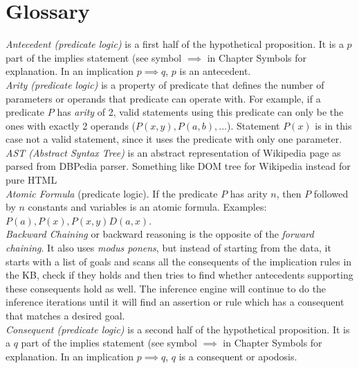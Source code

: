 % 
\chapter{Glossary}
\emph{Antecedent (predicate logic)} is a first half of the hypothetical 
proposition. It is a $p$ part of the implies statement (see symbol $\implies$ in
Chapter Symbols for explanation. In an implication $p \implies q$, $p$ is an
antecedent.\\

\emph{Arity (predicate logic)} is a property of predicate that defines the 
number of parameters or operands that predicate can operate with. For example,
if a predicate $P$ has \emph{arity} of 2, valid statements using this predicate
can only be the ones with exactly 2 operands ($P(x,y), P(a,b),...$). Statement
$P(x)$ is in this case not a valid statement, since it uses the predicate with
only one parameter.\\

\emph{AST (Abstract Syntax Tree)} is an abstract representation of Wikipedia 
page as parsed from DBPedia parser. Something like DOM tree for Wikipedia 
instead for pure HTML\\

\emph{Atomic Formula} (predicate logic). If the predicate $P$ has arity $n$,
then $P$ followed by $n$ constants and variables is an atomic formula. Examples:
$P(a), P(x), P(x,y) D(a,x)$.\\

\emph{Backward Chaining} or backward reasoning is the opposite of the 
\emph{forward chaining}. It also uses \emph{modus ponens}, but instead of 
starting from the data, it starts with a list of goals and scans all the 
consequents of the implication rules in the KB, check if they holds and then
tries to find whether antecedents supporting these consequents hold as well.
The inference engine will continue to do the inference iterations until it will
find an assertion or rule which has a consequent that matches a desired goal.\\

\emph{Consequent (predicate logic)} is a second half of the hypothetical 
proposition. It is a $q$ part of the implies statement (see symbol $\implies$ in
Chapter Symbols for explanation. In an implication $p \implies q$, $q$ is a
consequent or apodosis.\\

